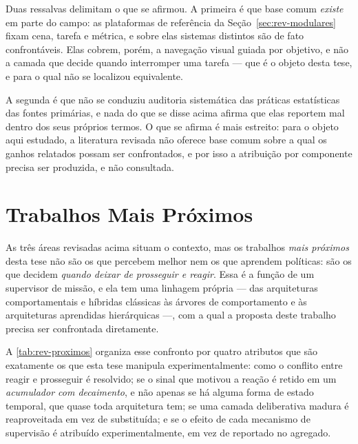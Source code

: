Duas ressalvas delimitam o que se afirmou. A primeira é que base comum \emph{existe} em
parte do campo: as plataformas de referência da Seção~\ref{sec:rev-modulares} fixam cena,
tarefa e métrica, e sobre elas sistemas distintos são de fato confrontáveis. Elas cobrem,
porém, a navegação visual guiada por objetivo, e não a camada que decide quando
interromper uma tarefa --- que é o objeto desta tese, e para o qual não se localizou
equivalente.

A segunda é que não se conduziu auditoria sistemática das práticas estatísticas das
fontes primárias, e nada do que se disse acima afirma que elas reportem mal dentro dos
seus próprios termos. O que se afirma é mais estreito: para o objeto aqui estudado, a
literatura revisada não oferece base comum sobre a qual os ganhos relatados possam ser
confrontados, e por isso a atribuição por componente precisa ser produzida, e não
consultada.

\section{Trabalhos Mais Próximos}
\label{sec:rev-proximos}

As três áreas revisadas acima situam o contexto, mas os trabalhos \emph{mais próximos}
desta tese não são os que percebem melhor nem os que aprendem políticas: são os que
decidem \emph{quando deixar de prosseguir e reagir}. Essa é a função de um supervisor de
missão, e ela tem uma linhagem própria --- das arquiteturas comportamentais e híbridas
clássicas às árvores de comportamento e às arquiteturas aprendidas hierárquicas ---, com
a qual a proposta deste trabalho precisa ser confrontada diretamente.

A \autoref{tab:rev-proximos} organiza esse confronto por quatro atributos que são
exatamente os que esta tese manipula experimentalmente: como o conflito entre reagir e
prosseguir é resolvido; se o sinal que motivou a reação é retido em um
\emph{acumulador com decaimento}, e não apenas se há alguma forma de estado
temporal, que quase toda arquitetura tem; se uma camada deliberativa madura é reaproveitada em vez de substituída; e se o
efeito de cada mecanismo de supervisão é atribuído experimentalmente, em vez de
reportado no agregado.

